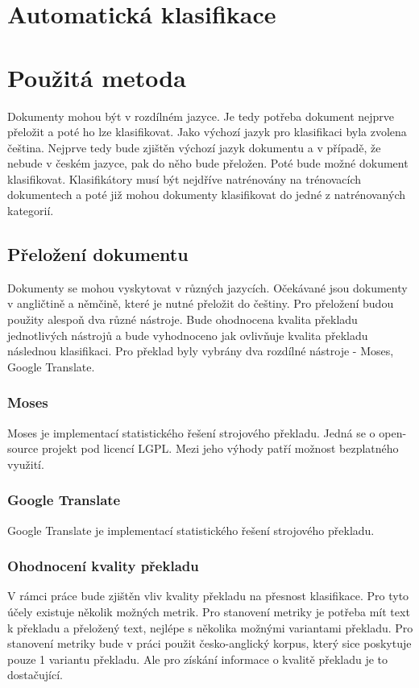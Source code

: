 \documentclass{bakalarka}[12pt]
\begin{document}
\chapter{Automatická klasifikace}


\chapter{Použitá metoda}
Dokumenty mohou být v rozdílném jazyce. Je tedy potřeba dokument nejprve přeložit a poté ho lze klasifikovat. Jako výchozí jazyk pro klasifikaci byla zvolena čeština. Nejprve tedy bude zjištěn výchozí jazyk dokumentu a v případě, že nebude v českém jazyce, pak do něho bude přeložen. Poté bude možné dokument klasifikovat. Klasifikátory musí být nejdříve natrénovány na trénovacích dokumentech a poté již mohou dokumenty klasifikovat do jedné z natrénovaných kategorií.

\section{Přeložení dokumentu} 
Dokumenty se mohou vyskytovat v různých jazycích. Očekávané jsou dokumenty v angličtině a němčině, které je nutné přeložit do češtiny. Pro přeložení budou použity alespoň dva různé nástroje. Bude ohodnocena kvalita překladu jednotlivých nástrojů a bude vyhodnoceno jak ovlivňuje kvalita překladu následnou klasifikaci. Pro překlad byly vybrány dva rozdílné nástroje - Moses, Google Translate.

\subsection{Moses} 
Moses je implementací statistického řešení strojového překladu. Jedná se o open-source projekt pod licencí LGPL. Mezi jeho výhody patří možnost bezplatného využití.

\subsection{Google Translate}
Google Translate je implementací statistického řešení strojového překladu.

\subsection{Ohodnocení kvality překladu}
V rámci práce bude zjištěn vliv kvality překladu na přesnost klasifikace. Pro tyto účely existuje několik možných metrik. Pro stanovení metriky je potřeba mít text k překladu a přeložený text, nejlépe s několika možnými variantami překladu. Pro stanovení metriky bude v práci použit česko-anglický korpus, který sice poskytuje pouze 1 variantu překladu. Ale pro získání informace o kvalitě překladu je to dostačující.
\end{document}
